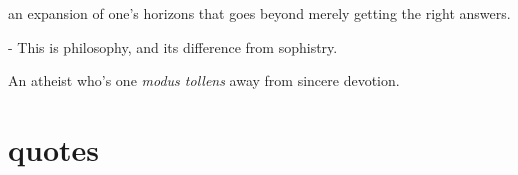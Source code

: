 \documentclass[]{article}
\begin{document}
an expansion of one's horizons that goes beyond merely getting the right answers.

- This is philosophy, and its difference from sophistry.

An atheist who's one \emph{modus tollens} away from sincere devotion.


\section{quotes}
\end{document}
